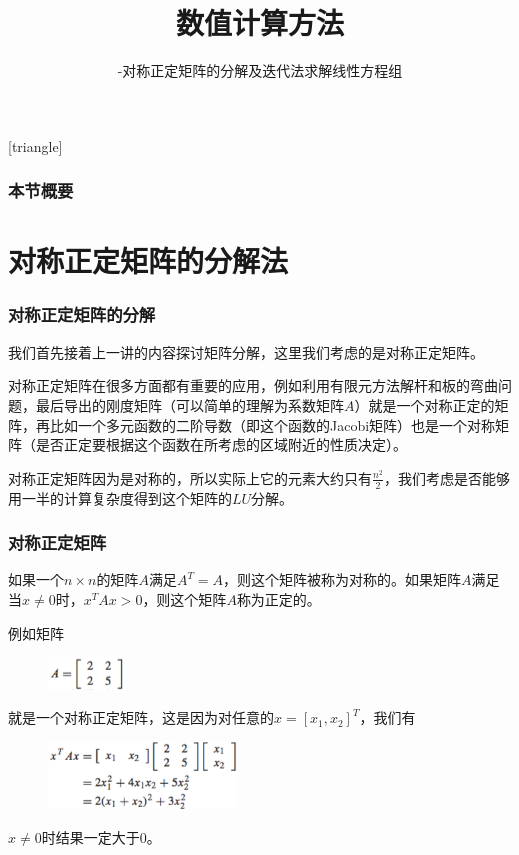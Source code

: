 \documentclass[10pt]{beamer}
\title[数值计算方法]{数值计算方法}
\subtitle{-对称正定矩阵的分解及迭代法求解线性方程组}
\begin{document}
[triangle]

\begin{frame}
\titlepage
\end{frame}


\begin{frame}
  \frametitle{本节概要}
  \tableofcontents%
\end{frame}


\section{对称正定矩阵的分解法}

\begin{frame}
\frametitle{对称正定矩阵的分解}
我们首先接着上一讲的内容探讨矩阵分解，这里我们考虑的是对称正定矩阵。

\vspace{0.2cm}

对称正定矩阵在很多方面都有重要的应用，例如利用有限元方法解杆和板的弯曲问题，最后导出的刚度矩阵（可以简单的理解为系数矩阵$A$）就是一个对称正定的矩阵，再比如一个多元函数的二阶导数（即这个函数的Jacobi矩阵）也是一个对称矩阵（是否正定要根据这个函数在所考虑的区域附近的性质决定）。

\vspace{0.2cm}

对称正定矩阵因为是对称的，所以实际上它的元素大约只有$\frac{n^2}{2}$，我们考虑是否能够用一半的计算复杂度得到这个矩阵的$LU$分解。
\end{frame}

\begin{frame}
\frametitle{对称正定矩阵}
\begin{definition}
如果一个$n\times n$的矩阵$A$满足$A^{T} = A$，则这个矩阵被称为对称的。如果矩阵$A$满足当$x \neq 0$时，$x^{T} A x >0$，则这个矩阵$A$称为正定的。
\end{definition}

例如矩阵
\begin{figure}
\includegraphics[width=2cm]{figs/2_6_SPD-1} 
\end{figure}
就是一个对称正定矩阵，这是因为对任意的$x = [x_1, x_2]^T$，我们有
\begin{figure}
\includegraphics[width=5cm]{figs/2_6_SPD-2} 
\end{figure}
$x \neq 0$时结果一定大于$0$。
\end{frame}
\end{document}
